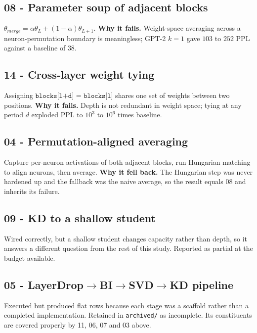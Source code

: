 \documentclass[11pt]{article}
\begin{document}
\subsection{08 - Parameter soup of adjacent blocks}
$\theta_{merge}=\alpha\theta_L+(1-\alpha)\theta_{L+1}$. \textbf{Why it
fails.} Weight-space averaging across a neuron-permutation boundary is
meaningless; GPT-2 $k{=}1$ gave $103$ to $252$ PPL against a baseline of
$38$.

\subsection{14 - Cross-layer weight tying}
Assigning $\texttt{blocks[l+d] = blocks[l]}$ shares one set of weights between
two positions. \textbf{Why it fails.} Depth is not redundant in weight space;
tying at any period $d$ exploded PPL to $10^3$ to $10^6$ times baseline.

\subsection{04 - Permutation-aligned averaging}
Capture per-neuron activations of both adjacent blocks, run Hungarian matching
to align neurons, then average. \textbf{Why it fell back.} The Hungarian step
was never hardened up and the fallback was the naive average, so the result
equals 08 and inherits its failure.

\subsection{09 - KD to a shallow student}
Wired correctly, but a shallow student changes capacity rather than depth,
so it answers a different question from the rest of this study. Reported as
partial at the budget available.

\subsection{05 - LayerDrop$\rightarrow$BI$\rightarrow$SVD$\rightarrow$KD pipeline}
Executed but produced flat rows because each stage was a scaffold rather than
a completed implementation. Retained in \texttt{archived/} as incomplete. Its
constituents are covered properly by 11, 06, 07 and 03 above.
\end{document}
